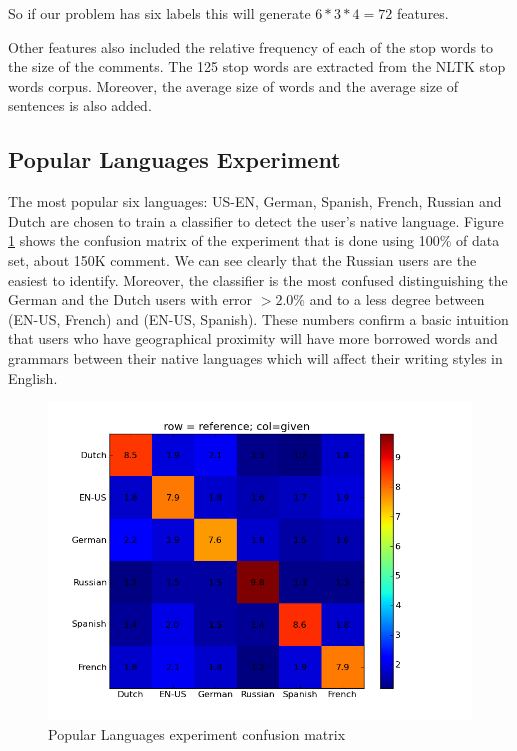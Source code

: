 \documentclass[11pt]{article}
\begin{document}
So if our problem has six labels this will generate $6*3*4 = 72$ features.

Other features also included the relative frequency of each of the stop words to the size of the comments. The  125 stop words are extracted from the NLTK stop words corpus. Moreover, the average size of words and the average size of sentences is also added.

\subsection{Popular Languages Experiment}
The most popular six languages: US-EN, German, Spanish, French, Russian and Dutch  are chosen to train a classifier to detect the user's native language. Figure \ref{pop_cfm} shows the confusion matrix of the experiment that is done using 100\% of data set, about 150K comment. We can see clearly that the Russian users are the easiest to identify. Moreover, the classifier is the most confused distinguishing the German and the Dutch users with error $>2.0\%$ and to a less degree between (EN-US, French) and (EN-US, Spanish). These numbers confirm a basic intuition that users who have geographical proximity will have more borrowed words and grammars between their native languages which will affect their writing styles in English.




\begin{figure}[htp]
\centering
\includegraphics[scale=0.45]{popular_cfm.png}
\caption{Popular Languages experiment confusion matrix}
\label{pop_cfm}
\end{figure}
\end{document}

